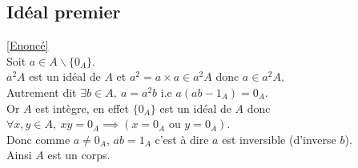 \documentclass[8pt]{book}
\begin{document}
	\subsection{Idéal premier }
	\label{Idéal premier corrigé}
	\textcolor{blue}{\hyperref[Idéal premier]{[Enoncé]}}\\
	Soit $a\in A\backslash\{0_A\}$.\\
	$a^2A$ est un idéal de $A$ et $a^2=a\times a\in a^2A$ donc $a\in a^2A$.\\
	Autrement dit $\exists b\in A,\ a=a^2b$ i.e $a(ab-1_A)=0_A$.\\
	Or $A$ est intègre, en effet $\{0_A\}$ est un idéal de $A$ donc $\forall x,y\in A,\ xy=0_A\implies (x=0_A\text{ ou }y=0_A)$.\\
	Donc comme $a\ne 0_A$, $ab=1_A$ c'est à dire $a$ est inversible (d'inverse $b$).\\
	Ainsi $A$ est un corps.
	
\end{document}
